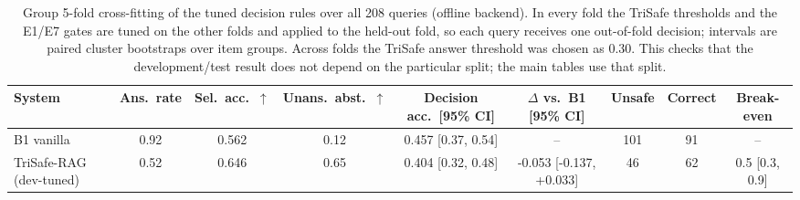 \begin{table}[t]
  \caption{Group 5-fold cross-fitting of the tuned decision rules over all 208 queries (offline backend). In every fold the TriSafe thresholds and the E1/E7 gates are tuned on the other folds and applied to the held-out fold, so each query receives one out-of-fold decision; intervals are paired cluster bootstraps over item groups. Across folds the TriSafe answer threshold was chosen as 0.30. This checks that the development/test result does not depend on the particular split; the main tables use that split.}
  \label{tab:cv-offline}
  \footnotesize
  \setlength{\tabcolsep}{4pt}
  \begin{tabular}{lcccccccc}
    \toprule
    System & Ans.\ rate & Sel.\ acc.\ $\uparrow$ & Unans.\ abst.\ $\uparrow$ & Decision acc.\ [95\% CI] & $\Delta$ vs.\ B1 [95\% CI] & Unsafe & Correct & Break-even \\
    \midrule
    B1 vanilla & 0.92 & 0.562 & 0.12 & 0.457 [0.37, 0.54] & -- & 101 & 91 & -- \\
    TriSafe-RAG (dev-tuned) & 0.52 & 0.646 & 0.65 & 0.404 [0.32, 0.48] & -0.053 [-0.137, +0.033] & 46 & 62 & 0.5 [0.3, 0.9] \\
    \bottomrule
  \end{tabular}
\end{table}
